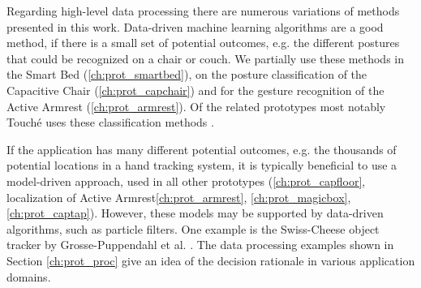 Regarding high-level data processing there are numerous variations of methods presented in this work. Data-driven machine learning algorithms are a good method, if there is a small set of potential outcomes, e.g. the different postures that could be recognized on a chair or couch. We partially use these methods in the Smart Bed (\ref{ch:prot_smartbed}), on the posture classification of the Capacitive Chair (\ref{ch:prot_capchair}) and for the gesture recognition of the Active Armrest (\ref{ch:prot_armrest}). Of the related prototypes most notably Touché uses these classification methods \cite{Sato2012}. 

If the application has many different potential outcomes, e.g. the thousands of potential locations in a hand tracking system, it is typically beneficial to use a model-driven approach, used in all other prototypes (\ref{ch:prot_capfloor}, localization of Active Armrest\ref{ch:prot_armrest}, \ref{ch:prot_magicbox}, \ref{ch:prot_captap}). However, these models may be supported by data-driven algorithms, such as particle filters. One example is the Swiss-Cheese object tracker by Grosse-Puppendahl et al. \cite{grosse2013swiss}. The data processing examples shown in Section \ref{ch:prot_proc} give an idea of the decision rationale in various application domains. 


